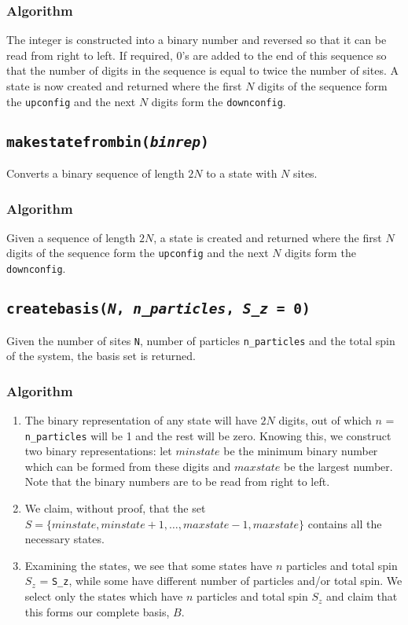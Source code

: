 \documentclass[]{book}
\begin{document}
\subsubsection*{Algorithm}
The integer is constructed into a binary number and reversed so that it can be read from right to left. If required, 0's are added to the end of this sequence so that the number of digits in the sequence is equal to twice the number of sites. A state is now created and returned where the first $N$ digits of the sequence form the \texttt{upconfig} and the next $N$ digits form the \texttt{downconfig}.

\subsection{\texttt{makestatefrombin(\textit{binrep})}}
Converts a binary sequence of length $2N$ to a state with $N$ sites.

\subsubsection*{Algorithm}
Given a sequence of length $2N$, a state is created and returned where the first $N$ digits of the sequence form the \texttt{upconfig} and the next $N$ digits form the \texttt{downconfig}.

\subsection{\texttt{createbasis(\textit{N}, \textit{n\_particles}, \textit{S\_z} = 0)}}
Given the number of sites \texttt{N}, number of particles \texttt{n\_particles} and the total spin of the system, the basis set is returned.

\subsubsection{Algorithm}
\begin{enumerate}
\item The binary representation of any state will have $2N$ digits, out of which $n$ = \texttt{n\_particles} will be 1 and the rest will be zero. Knowing this, we construct two binary representations: let $minstate$ be the minimum binary number which can be formed from these digits and $maxstate$ be the largest number. Note that the binary numbers are to be read from right to left.

\item  We claim, without proof, that the set $S = \{ minstate, minstate + 1, \ldots, maxstate - 1, maxstate \} $ contains all the necessary states.

\item Examining the states, we see that some states have $n$ particles and total spin $S_z$ = \texttt{S\_z}, while some have different number of particles and/or total spin. We select only the states which have $n$ particles and total spin $S_z$  and claim that this forms our complete basis, $B$.

\end{enumerate}
\end{document}
